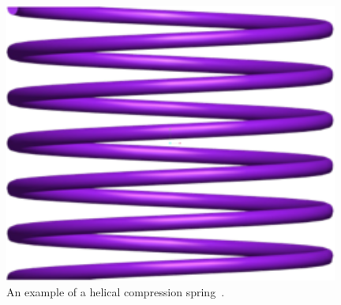 \documentclass[10pt]{article}
\begin{document}
		\begin{figure}[h]
		 \begin{center}\includegraphics[scale=.2]{Spring.png}\end{center}
		 \caption{An example of a helical compression spring~\cite{Massad2015}.}
		 \label{fig:Spring}
		 
		 \end{figure}
\end{document}
